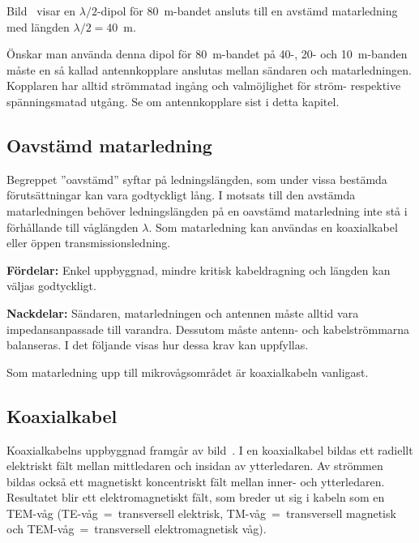
Bild~ visar en \(\lambda/2\)-dipol för 80~m-bandet
ansluts till en avstämd matarledning med längden \(\lambda/2 = 40\)~m.

Önskar man använda denna dipol för 80~m-bandet på 40-, 20- och 10~m-banden
måste en så kallad antennkopplare anslutas mellan sändaren och matarledningen.
Kopplaren har alltid strömmatad ingång och valmöjlighet för ström- respektive
spänningsmatad utgång.
Se om antennkopplare sist i detta kapitel.

\subsection{Oavstämd matarledning}
\label{oavstämd_matarledning}

Begreppet ''oavstämd'' syftar på ledningslängden, som under vissa
bestämda förutsättningar kan vara godtyckligt lång.
I motsats till den avstämda matarledningen behöver ledningslängden på en
oavstämd matarledning inte stå i förhållande till våglängden \(\lambda\).
Som matarledning kan användas en koaxialkabel eller öppen transmissionsledning.

\textbf{Fördelar:}
Enkel uppbyggnad, mindre kritisk kabeldragning och längden kan väljas godtyckligt.

\textbf{Nackdelar:}
Sändaren, matarledningen och antennen måste alltid vara impedansanpassade till
varandra.
Dessutom måste antenn- och kabelströmmarna balanseras.
I det följande visas hur dessa krav kan uppfyllas.

Som matarledning upp till mikrovågsområdet är koaxialkabeln vanligast.

\subsection{Koaxialkabel}


Koaxialkabelns uppbyggnad framgår av bild~.
I en koaxialkabel bildas ett radiellt elektriskt fält mellan mittledaren och
insidan av ytterledaren.
Av strömmen bildas också ett magnetiskt koncentriskt fält mellan inner- och
ytterledaren.
Resultatet blir ett elektromagnetiskt fält, som breder ut sig i kabeln som en
TEM-våg (TE-våg~=~transversell elektrisk, TM-våg~=~transversell magnetisk och
TEM-våg~=~transversell elektromagnetisk våg).

